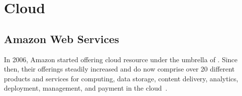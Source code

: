 \section{Cloud}

\subsection{Amazon Web Services}

In 2006, Amazon started offering cloud resource under the umbrella of .
Since then, their offerings steadily increased and do now comprise over 20 different products and services for computing, data storage, content delivery, analytics, deployment, management, and payment in the cloud~\autocite{aws:about}.
